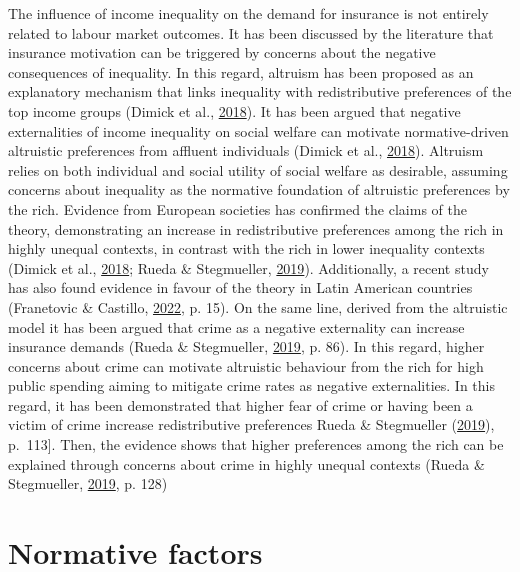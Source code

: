 \documentclass[
  12pt,
]{book}
\begin{document}
The influence of income inequality on the demand for insurance is not entirely related to labour market outcomes. It has been discussed by the literature that insurance motivation can be triggered by concerns about the negative consequences of inequality. In this regard, altruism has been proposed as an explanatory mechanism that links inequality with redistributive preferences of the top income groups (Dimick et al., \protect\hyperlink{ref-dimick_models_2018}{2018}). It has been argued that negative externalities of income inequality on social welfare can motivate normative-driven altruistic preferences from affluent individuals (Dimick et al., \protect\hyperlink{ref-dimick_models_2018}{2018}). Altruism relies on both individual and social utility of social welfare as desirable, assuming concerns about inequality as the normative foundation of altruistic preferences by the rich. Evidence from European societies has confirmed the claims of the theory, demonstrating an increase in redistributive preferences among the rich in highly unequal contexts, in contrast with the rich in lower inequality contexts (Dimick et al., \protect\hyperlink{ref-dimick_models_2018}{2018}; Rueda \& Stegmueller, \protect\hyperlink{ref-rueda_who_2019}{2019}). Additionally, a recent study has also found evidence in favour of the theory in Latin American countries (Franetovic \& Castillo, \protect\hyperlink{ref-franetovic_preferences_2022}{2022}, p. 15). On the same line, derived from the altruistic model it has been argued that crime as a negative externality can increase insurance demands (Rueda \& Stegmueller, \protect\hyperlink{ref-rueda_who_2019}{2019}, p. 86). In this regard, higher concerns about crime can motivate altruistic behaviour from the rich for high public spending aiming to mitigate crime rates as negative externalities. In this regard, it has been demonstrated that higher fear of crime or having been a victim of crime increase redistributive preferences Rueda \& Stegmueller (\protect\hyperlink{ref-rueda_who_2019}{2019}), p.~113{]}. Then, the evidence shows that higher preferences among the rich can be explained through concerns about crime in highly unequal contexts (Rueda \& Stegmueller, \protect\hyperlink{ref-rueda_who_2019}{2019}, p. 128)

\hypertarget{normative-factors}{%
\chapter{Normative factors}\label{normative-factors}}
\end{document}
